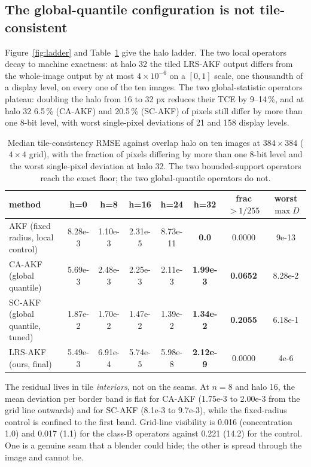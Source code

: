 \documentclass[journal]{IEEEtran}
\begin{document}
\subsection{The global-quantile configuration is not tile-consistent}\label{the-global-quantile-configuration-is-not-tile-consistent}

Figure~\ref{fig:ladder} and Table~\ref{tab:ladder} give the halo ladder. The two local operators decay to machine exactness: at halo 32 the tiled LRS-AKF output differs from the whole-image output by at most \(4\times10^{-6}\) on a \([0,1]\) scale, one thousandth of a display level, on every one of the ten images. The two global-statistic operators plateau: doubling the halo from 16 to 32 px reduces their TCE by 9--14\,\%, and at halo 32 6.5\,\% (CA-AKF) and 20.5\,\% (SC-AKF) of pixels still differ by more than one 8-bit level, with worst single-pixel deviations of 21 and 158 display levels.

\begin{table}[t]
\caption{Median tile-consistency RMSE against overlap halo on ten images at $384\times384$ ($4\times4$ grid), with the fraction of pixels differing by more than one 8-bit level and the worst single-pixel deviation at halo 32. The two bounded-support operators reach the exact floor; the two global-quantile operators do not.}
\label{tab:ladder}
\centering
\footnotesize
\begin{tabular}{@{}lccccccc@{}}
\toprule
method & h=0 & h=8 & h=16 & h=24 & h=32 & frac$>1/255$ & worst $\max D$ \\
\midrule
AKF (fixed radius, local control) & 8.28e-3 & 1.10e-3 & 2.31e-5 & 8.73e-11 & \textbf{0.0} & 0.0000 & 9e-13 \\
CA-AKF (global quantile) & 5.69e-3 & 2.48e-3 & 2.25e-3 & 2.11e-3 & \textbf{1.99e-3} & \textbf{0.0652} & 8.28e-2 \\
SC-AKF (global quantile, tuned) & 1.87e-2 & 1.70e-2 & 1.47e-2 & 1.39e-2 & \textbf{1.34e-2} & \textbf{0.2055} & 6.18e-1 \\
LRS-AKF (ours, final) & 5.49e-3 & 6.91e-4 & 5.74e-5 & 5.98e-8 & \textbf{2.12e-9} & 0.0000 & 4e-6 \\
\bottomrule
\end{tabular}
\end{table}

The residual lives in tile \emph{interiors}, not on the seams. At \(n=8\) and halo 16, the mean deviation per border band is flat for CA-AKF (1.75e-3 to 2.00e-3 from the grid line outwards) and for SC-AKF (8.1e-3 to 9.7e-3), while the fixed-radius control is confined to the first band. Grid-line visibility is 0.016 (concentration 1.0) and 0.017 (1.1) for the class-B operators against 0.221 (14.2) for the control. One is a genuine seam that a blender could hide; the other is spread through the image and cannot be.
\end{document}
